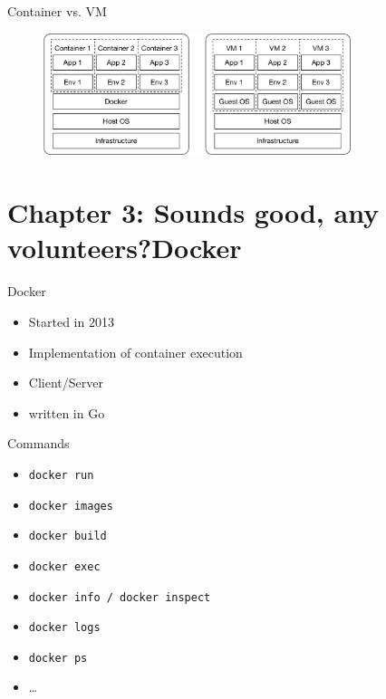 \documentclass[aspectratio=169]{beamer}
\begin{document}
	\begin{frame}{Container vs. VM}
	    \begin{figure}
			\includegraphics[width=0.8\textwidth]{./assets/container_vm.pdf}
	    \end{figure}
	\end{frame}

	\section{Chapter 3: Sounds good, any volunteers?\newline Docker}

	\begin{frame}[allowframebreaks]{Docker}
		\begin{itemize}
			\item Started in 2013
			\item Implementation of container execution
			\item Client/Server
			\item written in Go
		\end{itemize}
		\framebreak
		Commands
		\begin{itemize}
			\item \texttt{docker run}
			\item \texttt{docker images}
			\item \texttt{docker build}
			\item \texttt{docker exec}
			\item \texttt{docker info / docker inspect}
			\item \texttt{docker logs}
			\item \texttt{docker ps}
			\item \dots
		\end{itemize}
	\end{frame}
\end{document}
